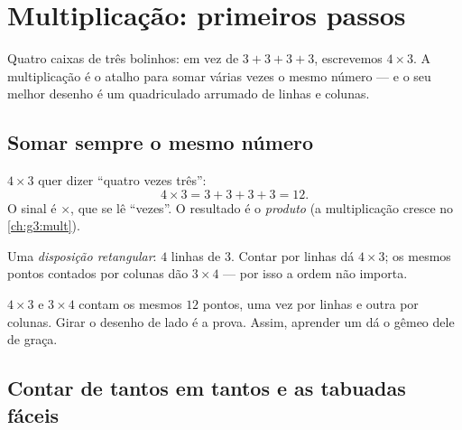 \chapter{Multiplicação: primeiros passos}\label{ch:g2:mult}

Quatro caixas de três bolinhos: em vez de $3 + 3 + 3 + 3$,
escrevemos $4 \times 3$. A multiplicação é o atalho para somar
várias vezes o mesmo número --- e o seu melhor desenho é um
quadriculado arrumado de linhas e colunas.

\section{Somar sempre o mesmo número}

\begin{definition}[Multiplicação]\label{def:g2:mult:def}
$4 \times 3$ quer dizer ``quatro vezes três'':
\[
4 \times 3 = 3 + 3 + 3 + 3 = 12 .
\]
O sinal é $\times$, que se lê ``vezes''. O resultado é o
\emph{produto} (a multiplicação cresce no \cref{ch:g3:mult}).
\end{definition}

\begin{omfigure}

{\small Uma \emph{disposição retangular}: $4$ linhas de $3$. Contar
por linhas dá $4 \times 3$; os mesmos pontos contados por colunas dão
$3 \times 4$ --- por isso a ordem não importa.}
\end{omfigure}

\begin{example}\label{ex:g2:mult:order}
$4 \times 3$ e $3 \times 4$ contam os mesmos $12$ pontos, uma vez
por linhas e outra por colunas. Girar o desenho de lado é a prova.
Assim, aprender um  dá o gêmeo dele de graça.
\end{example}

\section{Contar de tantos em tantos e as tabuadas fáceis}

